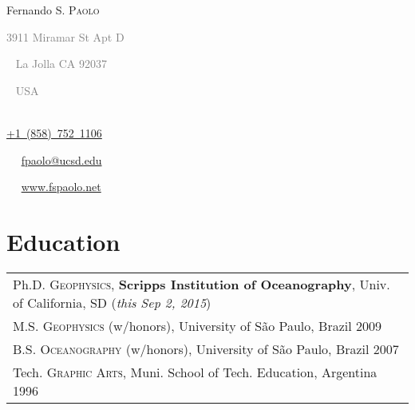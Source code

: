 \documentclass[a4paper,11pt]{article}
\newcommand*{\tbullet}{~\strut\textcolor{grey}{\LARGE\textbullet}~~}
\newcommand*{\tdash}{\strut\textcolor{grey}{\textemdash}~}
\begin{document}
\pagestyle{empty} 



\begin{center}
{\Huge 
Fernando S. \textsc{Paolo}
}\\[0.2cm]
%
\textcolor{grey}{
3911 Miramar St Apt D \tdash 
La Jolla CA 92037 \tdash
USA
}\\[0.01cm]
%
\href{}{+1~(858)~752~1106} \tbullet 
\href{mailto:fpaolo@ucsd.edu}{fpaolo@ucsd.edu} \tbullet 
\href{http://fspaolo.net}{www.fspaolo.net}
\end{center}
\vspace*{0.7cm}

%


\section{Education}

\begin{tabular}{l}
Ph.D. \textsc{Geophysics}, \textbf{Scripps Institution of Oceanography}, Univ.
    of California, SD (\emph{this Sep 2, 2015})\\
M.S. \textsc{Geophysics} (w/honors), University of S\~ao Paulo, Brazil 2009\\
B.S. \textsc{Oceanography} (w/honors), University of S\~ao Paulo, Brazil 2007\\
Tech. \textsc{Graphic Arts}, Muni. School of Tech. Education, Argentina 1996\\
\end{tabular}
\end{document}
